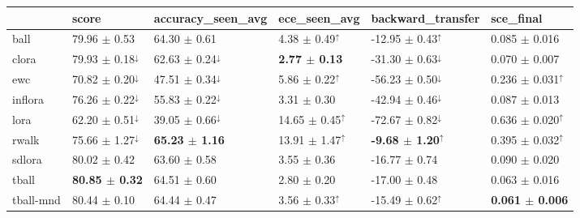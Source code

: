 \begin{tabular}{llllll}
\toprule
 & {\small score} & {\small accuracy\_seen\_avg} & {\small ece\_seen\_avg} & {\small backward\_transfer} & {\small sce\_final} \\
\midrule
ball & \small 79.96 $\pm$ 0.53 & \small 64.30 $\pm$ 0.61 & \small 4.38 $\pm$ 0.49$^{\uparrow}$ & \small -12.95 $\pm$ 0.43$^{\uparrow}$ & \small 0.085 $\pm$ 0.016 \\
clora & \small 79.93 $\pm$ 0.18$^{\downarrow}$ & \small 62.63 $\pm$ 0.24$^{\downarrow}$ & \small \textbf{2.77 $\pm$ 0.13} & \small -31.30 $\pm$ 0.63$^{\downarrow}$ & \small 0.070 $\pm$ 0.007 \\
ewc & \small 70.82 $\pm$ 0.20$^{\downarrow}$ & \small 47.51 $\pm$ 0.34$^{\downarrow}$ & \small 5.86 $\pm$ 0.22$^{\uparrow}$ & \small -56.23 $\pm$ 0.50$^{\downarrow}$ & \small 0.236 $\pm$ 0.031$^{\uparrow}$ \\
inflora & \small 76.26 $\pm$ 0.22$^{\downarrow}$ & \small 55.83 $\pm$ 0.22$^{\downarrow}$ & \small 3.31 $\pm$ 0.30 & \small -42.94 $\pm$ 0.46$^{\downarrow}$ & \small 0.087 $\pm$ 0.013 \\
lora & \small 62.20 $\pm$ 0.51$^{\downarrow}$ & \small 39.05 $\pm$ 0.66$^{\downarrow}$ & \small 14.65 $\pm$ 0.45$^{\uparrow}$ & \small -72.67 $\pm$ 0.82$^{\downarrow}$ & \small 0.636 $\pm$ 0.020$^{\uparrow}$ \\
rwalk & \small 75.66 $\pm$ 1.27$^{\downarrow}$ & \small \textbf{65.23 $\pm$ 1.16} & \small 13.91 $\pm$ 1.47$^{\uparrow}$ & \small \textbf{-9.68 $\pm$ 1.20}$^{\uparrow}$ & \small 0.395 $\pm$ 0.032$^{\uparrow}$ \\
sdlora & \small 80.02 $\pm$ 0.42 & \small 63.60 $\pm$ 0.58 & \small 3.55 $\pm$ 0.36 & \small -16.77 $\pm$ 0.74 & \small 0.090 $\pm$ 0.020 \\
tball & \small \textbf{80.85 $\pm$ 0.32} & \small 64.51 $\pm$ 0.60 & \small 2.80 $\pm$ 0.20 & \small -17.00 $\pm$ 0.48 & \small 0.063 $\pm$ 0.016 \\
tball-mnd & \small 80.44 $\pm$ 0.10 & \small 64.44 $\pm$ 0.47 & \small 3.56 $\pm$ 0.33$^{\uparrow}$ & \small -15.49 $\pm$ 0.62$^{\uparrow}$ & \small \textbf{0.061 $\pm$ 0.006} \\
\bottomrule
\end{tabular}
